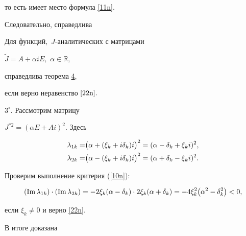 то есть имеет место формула \eqref{11n}.

Следовательно,  справедлива



\smallskip



 \begin{lemma}[3] Для функций$,$ $J$-аналитических с матрицами

   $\widetilde{J}=A+\alpha iE,$ $\alpha\in\mathbb{R},$

  справедлива теорема  {\rm \hyperlink{nik:th4}{4},} 

  если верно неравенство $\eqref{22n}.$

  \end{lemma}



\smallskip



  $3^\circ.$ Рассмотрим матрицу

  $J^{*2}=(\alpha E+Ai)^2.$ Здесь

  \begin{gather}

  \lambda_{1k}=\bigr(\alpha+(\xi_k+i\delta_k)i\bigr)^2=

  (\alpha-\delta_k+\xi_ki)^2,\notag\\

  \lambda_{2k}=\bigr(\alpha-(\xi_k+i\delta_k)i\bigr)^2=

  (\alpha+\delta_k-\xi_ki)^2.\notag

  \end{gather}







   Проверим выполнение критерия (\ref{10n}):

\begin{equation}

\left(\mathop{\rm Im} \lambda_{1k} \right)\cdot

\left(\mathop{\rm Im} \lambda_{2k} \right)%

=-2\xi_k(\alpha-\delta_k)\cdot

2\xi_k(\alpha+\delta_k)=-4\xi_k^2\bigr(\alpha^2-\delta_k^2\bigr)<0,

  \end{equation}

если $\xi_k\ne 0 $ и  верно \eqref{22n}.

В итоге доказана



